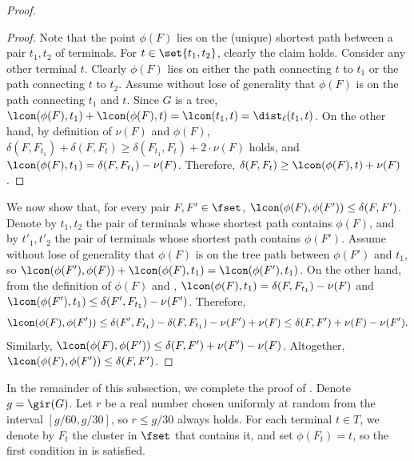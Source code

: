 \begin{proof}
\begin{proof}
Note that the point $\phi(F)$ lies on the (unique) shortest path between a pair $t_1,t_2$ of terminals.
For $t\in \set{t_1,t_2}$, clearly the claim holds.
Consider any other terminal $t$. Clearly $\phi(F)$ lies on either the path connecting $t$ to $t_1$ or the path connecting $t$ to $t_2$. 
Assume without lose of generality that $\phi(F)$ is on the path connecting $t_1$ and $t$.
Since $G$ is a tree, $\lcon(\phi(F),t_1)+\lcon(\phi(F),t) = \lcon(t_1,t) = \dist_{\ell}(t_1,t)$. On the other hand, by definition of $\nu(F)$ and $\phi(F)$, $\delta(F,F_{t_1})+\delta(F,F_t) \ge \delta(F_{t_1},F_{t}) + 2 \cdot\nu(F)$ holds, and $\lcon(\phi(F),t_1) = \delta(F,F_{t_1}) - \nu(F)$. Therefore, $\delta(F,F_t) \ge \lcon(\phi(F),t) + \nu(F)$.
\end{proof}
    
We now show that, for every pair $F,F'\in \fset$, $\lcon(\phi(F),\phi(F')) \le \delta(F,F')$. 
Denote by $t_1,t_2$ the pair of terminals whose shortest path contains $\phi(F)$, and by $t'_1,t'_2$ the pair of terminals whose shortest path contains $\phi(F')$.
Assume without lose of generality that $\phi(F)$ is on the tree path between $\phi(F')$ and $t_1$, so $\lcon(\phi(F'),\phi(F)) + \lcon(\phi(F),{t_1}) = \lcon(\phi(F'),{t_1})$. On the other hand, from the definition of $\phi(F)$ and , $\lcon(\phi(F),{t_1}) = \delta(F,F_{t_1}) - \nu(F)$ and $\lcon(\phi(F'),{t_1}) \le \delta(F',F_{t_1}) - \nu(F')$. Therefore, 
$$\lcon(\phi(F),\phi(F')) \le \delta(F',F_{t_1}) - \delta(F,F_{t_1}) - \nu(F') + \nu(F) \le \delta(F,F') + \nu(F) - \nu(F').$$ Similarly, $\lcon(\phi(F),\phi(F')) \le \delta(F,F') + \nu(F') - \nu(F)$. Altogether, $\lcon(\phi(F),\phi(F')) \le \delta(F,F')$.
\end{proof}


In the remainder of this subsection, we complete the proof of .
Denote $g=\gir(G)$. 
Let $r$ be a real number chosen uniformly at random from the interval $[g/60,g/30]$, so $r\le g/30$ always holds.
For each terminal $t\in T$, we denote by $F_t$ the cluster in $\fset$ that contains it, and set $\phi(F_t)=t$, so the first condition in  is satisfied.



